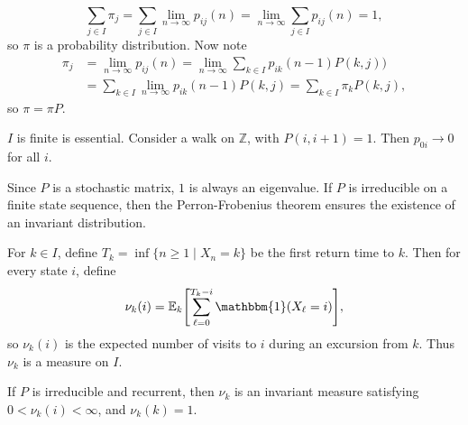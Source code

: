 \documentclass[12pt]{article}
\begin{document}
\begin{proofbox}
	\[
		\sum_{j \in I}\pi_j = \sum_{j \in I}\lim_{n \to \infty}p_{ij}(n) = \lim_{n \to \infty}\sum_{j \in I}p_{ij}(n) = 1,
	\]
	so $\pi$ is a probability distribution. Now note
	\begin{align*}
		\pi_j &= \lim_{n \to \infty}p_{ij}(n) = \lim_{n \to \infty} \sum_{k \in I}p_{ik}(n-1) P(k, j)) \\
		    &= \sum_{k \in I}\lim_{n \to \infty}p_{ik}(n-1) P(k, j) = \sum_{k \in I}\pi_k P(k, j),
	\end{align*}
	so $\pi = \pi P$.
\end{proofbox}
\begin{remark}
	$I$ is finite is essential. Consider a walk on $\mathbb{Z}$, with $P(i, i+1) = 1$. Then $p_{0i} \to 0$ for all $i$.

	Since $P$ is a stochastic matrix, $1$ is always an eigenvalue. If $P$ is irreducible on a finite state sequence, then the Perron-Frobenius theorem ensures the existence of an invariant distribution.
\end{remark}

\begin{definition}
	For $k \in I$, define $T_k = \inf\{n \geq 1 \mid X_n = k\}$ be the first return time to $k$. Then for every state $i$, define
	\[
		\nu_k(i) = \mathbb{E}_k\Biggl[ \sum_{\ell = 0}^{T_k - i} \mathbbm{1}(X_{\ell} = i) \Biggr]
	,\]
	so $\nu_k(i)$ is the expected number of visits to $i$ during an excursion from $k$. Thus $\nu_k$ is a measure on $I$.
\end{definition}

\begin{theorem}
	If $P$ is irreducible and recurrent, then $\nu_k$ is an invariant measure satisfying $0 < \nu_k(i) < \infty$, and $\nu_k(k) = 1$.
\end{theorem}
\end{document}
